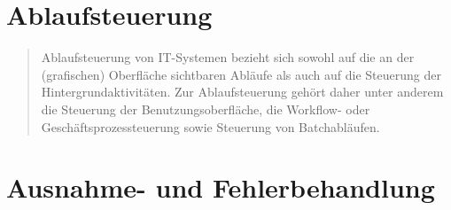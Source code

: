 
	



\section{Ablaufsteuerung}

\begin{quote}
	Ablaufsteuerung von IT-Systemen bezieht sich sowohl auf die an der (grafischen) Oberfläche sichtbaren Abläufe als auch auf die Steuerung der Hintergrundaktivitäten. Zur Ablaufsteuerung gehört daher unter anderem die Steuerung der Benutzungsoberfläche, die Workflow- oder Geschäftsprozessteuerung sowie Steuerung von Batchabläufen.
\end{quote}

\section{Ausnahme- und Fehlerbehandlung}

